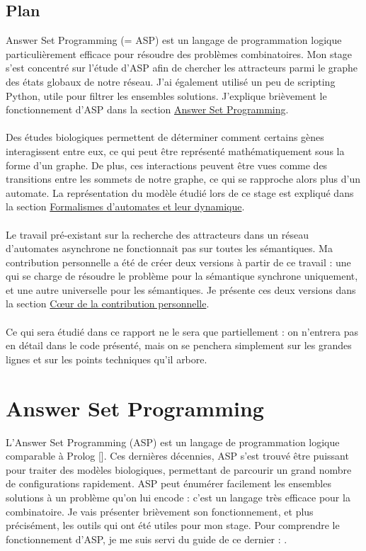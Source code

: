 \documentclass[10pt,a4paper]{article}
\begin{document}
\subsection{Plan}
Answer Set Programming (= ASP) est un langage de programmation logique particulièrement efficace pour résoudre des problèmes combinatoires. Mon stage s'est concentré sur l'étude d'ASP afin de chercher les attracteurs parmi le 
graphe des états globaux de notre réseau. J'ai également utilisé un peu de scripting Python, utile pour filtrer les ensembles solutions. J'explique brièvement le fonctionnement d'ASP dans la section \hyperref[asp]{Answer Set 
Programming}.\\ \\
Des études biologiques permettent de déterminer comment certains gènes interagissent entre eux, ce qui peut être représenté mathématiquement sous la forme d'un graphe. De plus, ces interactions peuvent être vues comme des 
transitions entre les sommets de notre graphe, ce qui se rapproche alors plus d'un automate. La représentation du modèle étudié lors de ce stage est expliqué dans la section \hyperref[fad]{Formalismes d'automates et leur 
dynamique}.\\ \\
Le travail pré-existant sur la recherche des attracteurs dans un réseau d'automates asynchrone ne fonctionnait pas sur toutes les sémantiques. Ma contribution personnelle a été de créer deux versions à partir de ce travail : 
une qui se charge de résoudre le problème pour la sémantique synchrone uniquement, et une autre  universelle pour les sémantiques. Je présente ces deux versions dans la section \hyperref[ccp]{Cœur de la contribution 
personnelle}.\\ \\
Ce qui sera étudié dans ce rapport ne le sera que partiellement : on n'entrera pas en détail dans le code présenté, mais on se penchera simplement sur les grandes lignes et sur les points techniques qu'il arbore.

\section{Answer Set Programming}
\label{asp}
L'Answer Set Programming (ASP) est un langage de programmation logique comparable à Prolog [\cite{Baral03}]. Ces dernières décennies, ASP s'est trouvé être puissant pour traiter des modèles biologiques, permettant de parcourir 
un grand nombre de configurations rapidement. ASP peut énumérer facilement les ensembles solutions à un problème qu'on lui encode : c'est un langage très efficace pour la combinatoire. Je vais présenter brièvement 
son fonctionnement, et plus précisément, les outils qui ont été utiles pour mon stage. Pour comprendre le fonctionnement d'ASP, je me suis servi du guide de ce dernier : \cite{potassco}.
\end{document}
